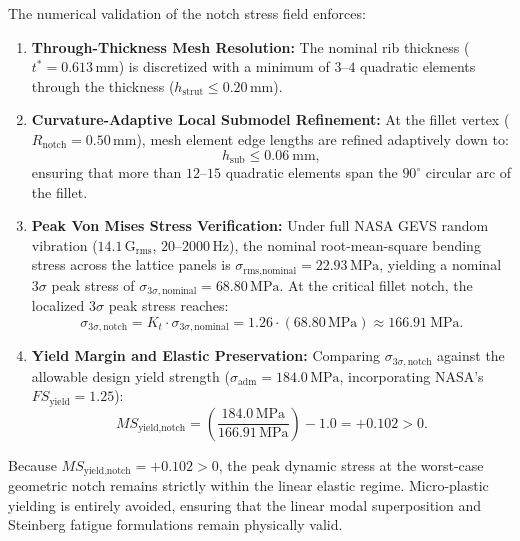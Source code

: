 The numerical validation of the notch stress field enforces:
\begin{enumerate}
\item \textbf{Through-Thickness Mesh Resolution:} The nominal rib thickness ($t^* = 0.613\,\text{mm}$) is discretized with a minimum of $3\text{--}4$ quadratic elements through the thickness ($h_{\text{strut}} \le 0.20\,\text{mm}$).
\item \textbf{Curvature-Adaptive Local Submodel Refinement:} At the fillet vertex ($R_{\text{notch}} = 0.50\,\text{mm}$), mesh element edge lengths are refined adaptively down to:
\begin{equation}
h_{\text{sub}} \le \SI{0.06}{\milli\meter},
\label{eq:mesh_refinement_size}
\end{equation}
ensuring that more than $12\text{--}15$ quadratic elements span the $90^\circ$ circular arc of the fillet.
\item \textbf{Peak Von Mises Stress Verification:} Under full NASA GEVS random vibration ($14.1\,\text{G}_{\text{rms}}$, $20\text{--}2000\,\text{Hz}$), the nominal root-mean-square bending stress across the lattice panels is $\sigma_{\text{rms,nominal}} = 22.93\,\text{MPa}$, yielding a nominal $3\sigma$ peak stress of $\sigma_{3\sigma,\text{nominal}} = 68.80\,\text{MPa}$. At the critical fillet notch, the localized $3\sigma$ peak stress reaches:
\begin{equation}
\sigma_{3\sigma,\text{notch}} = K_t \cdot \sigma_{3\sigma,\text{nominal}} = 1.26 \cdot (68.80\,\text{MPa}) \approx \SI{166.91}{\mega\pascal}.
\label{eq:notch_peak_stress}
\end{equation}
\item \textbf{Yield Margin and Elastic Preservation:} Comparing $\sigma_{3\sigma,\text{notch}}$ against the allowable design yield strength ($\sigma_{\text{adm}} = 184.0\,\text{MPa}$, incorporating NASA's $FS_{\text{yield}} = 1.25$):
\begin{equation}
MS_{\text{yield,notch}} = \left(\frac{184.0\,\text{MPa}}{166.91\,\text{MPa}}\right) - 1.0 = \mathbf{+0.102} > 0.
\label{eq:ms_yield_notch}
\end{equation}
\end{enumerate}

Because $MS_{\text{yield,notch}} = +0.102 > 0$, the peak dynamic stress at the worst-case geometric notch remains strictly within the linear elastic regime. Micro-plastic yielding is entirely avoided, ensuring that the linear modal superposition and Steinberg fatigue formulations remain physically valid.


